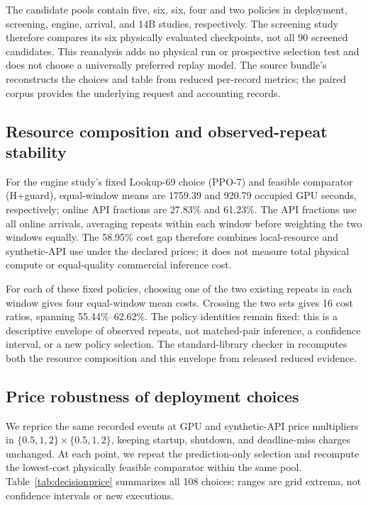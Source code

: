 The candidate pools contain five, six, six, four and two policies in deployment, screening, engine, arrival, and 14B studies,
respectively. The screening study therefore compares its six physically evaluated checkpoints,
not all 90 screened candidates. This reanalysis adds no physical run or
prospective selection test and does not choose a universally preferred replay
model. The source bundle's  reconstructs the
choices and table from reduced per-record metrics; the paired corpus provides
the underlying request and accounting records.


\subsection{Resource composition and observed-repeat stability}
For the engine study's fixed Lookup-69 choice (PPO-7) and feasible comparator
(H+guard), equal-window means are 1759.39 and 920.79 occupied GPU seconds,
respectively; online API fractions are 27.83\% and 61.23\%. The API fractions
use all online arrivals, averaging repeats within each window before weighting
the two windows equally. The 58.95\% cost gap therefore combines local-resource
and synthetic-API use under the declared prices; it does not measure total
physical compute or equal-quality commercial inference cost.

For each of these fixed policies, choosing one of the two existing repeats in
each window gives four equal-window mean costs. Crossing the two sets gives
16 cost ratios, spanning 55.44\%--62.62\%. The policy identities remain fixed:
this is a descriptive envelope of observed repeats, not matched-pair inference,
a confidence interval, or a new policy selection. The standard-library checker
in  recomputes both the resource composition
and this envelope from released reduced evidence.

\subsection{Price robustness of deployment choices}
We reprice the same recorded events at GPU and synthetic-API price
multipliers in $\{0.5,1,2\}\times\{0.5,1,2\}$, keeping startup, shutdown,
and deadline-miss charges unchanged. At each point, we repeat the prediction-only
selection and recompute the lowest-cost physically feasible comparator within
the same pool. Table~\ref{tab:decisionprice} summarizes all 108 choices; ranges
are grid extrema, not confidence intervals or new executions.

